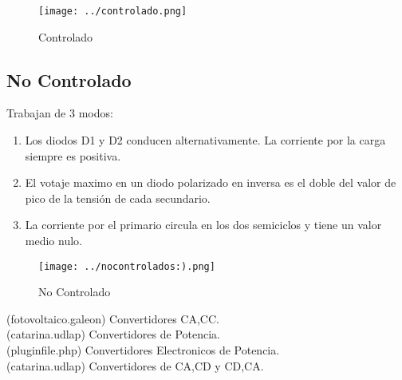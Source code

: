 \documentclass[11pt,a4paper]{article}
\begin{document}
\begin{figure}[h]
\centering
\texttt{[image: ../controlado.png]}   
\caption{Controlado} 
\end{figure} 

\subsection{No Controlado}
Trabajan de 3 modos:\begin{enumerate}
\item Los  diodos  D1  y  D2  conducen  alternativamente.  La  corriente  por  la  carga  siempre es positiva.
\item El votaje  maximo  en  un  diodo  polarizado  en  inversa  es  el  doble  del  valor  de pico de la tensión de cada secundario.
\item La  corriente  por  el  primario  circula  en  los  dos  semiciclos  y  tiene  un  valor  medio nulo.
\end{enumerate}

\begin{figure}[h]
\centering
\texttt{[image: ../nocontrolados:).png]}    
\caption{No Controlado} 
\end{figure} 

\begin{thebibliography}
(fotovoltaico.galeon) Convertidores CA,CC.\\
(catarina.udlap) Convertidores de Potencia.\\
(pluginfile.php) Convertidores Electronicos de Potencia.\\
(catarina.udlap) Convertidores de CA,CD y CD,CA.
\end{thebibliography} 	
 	
\end{document}
